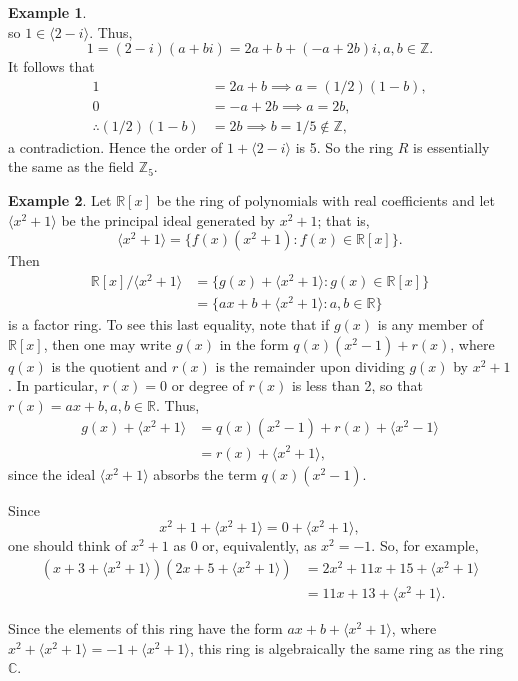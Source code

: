 \documentclass{article}
\theoremstyle{definition}
\newtheorem{example}{Example}[section]
\begin{document}
\begin{example}
\begin{equation*}
    \end{equation*}
    so $1\in\langle 2-i \rangle$. Thus,
    \begin{equation*}
        1=(2-i)(a+bi)=2a+b+(-a+2b)i, a,b \in\mathbb{Z}.
    \end{equation*}
    It follows that 
    \begin{align*}
        1&=2a+b \implies a=(1/2)(1-b), \\ 
        0&=-a+2b \implies a=2b,\\
        \therefore (1/2)(1-b)&=2b \implies b=1/5\notin\mathbb{Z},
    \end{align*}
    a contradiction. Hence the order of $1+\langle 2-i \rangle$ is 5. So the ring $R$ is essentially the same as the field $\mathbb{Z}_5$.
\end{example}

\begin{example}
    Let $\mathbb{R}[x]$ be the ring of polynomials with real coefficients and let $\langle x^2+1 \rangle$ be the principal ideal generated by $x^2+1$; that is,
    \begin{equation*}
        \langle x^2+1 \rangle = \{f(x)(x^2+1): f(x)\in\mathbb{R}[x]\}.
    \end{equation*}
    Then
    \begin{align*}
        \mathbb{R}[x]/\langle x^2+1 \rangle &= \{g(x)+\langle x^2+1 \rangle: g(x)\in\mathbb{R}[x]\} \\
        &= \{ax+b+\langle x^2+1 \rangle: a,b\in\mathbb{R}\}
    \end{align*}
    is a factor ring. To see this last equality, note that if $g(x)$ is any member of $\mathbb{R}[x]$, then one may write $g(x)$ in the form $q(x)(x^2-1)+r(x)$, where $q(x)$ is the quotient and $r(x)$ is the remainder upon dividing $g(x)$ by $x^2+1$. In particular, $r(x)=0$ or degree of $r(x)$ is less than 2, so that $r(x)=ax+b, a,b\in\mathbb{R}$. Thus,
    \begin{align*}
        g(x)+\langle x^2+1 \rangle &= q(x)(x^2-1)+r(x)+\langle x^2-1 \rangle \\
        &= r(x)+\langle x^2+1 \rangle,
    \end{align*}
    since the ideal $\langle x^2+1 \rangle$ absorbs the term $q(x)(x^2-1)$.
    
    Since 
    \begin{equation*}
        x^2+1+\langle x^2+1 \rangle = 0 + \langle x^2+1 \rangle,
    \end{equation*}
    one should think of $x^2+1$ as 0 or, equivalently, as $x^2=-1$. So, for example,
    \begin{align*}
        (x+3+\langle x^2+1 \rangle)(2x+5+\langle x^2+1 \rangle)&=2x^2+11x+15+\langle x^2+1 \rangle \\
        &=11x+13+\langle x^2+1 \rangle.
    \end{align*}
    
    Since the elements of this ring have the form $ax+b+\langle x^2+1 \rangle$, where $x^2+\langle x^2+1 \rangle=-1+\langle x^2+1 \rangle$, this ring is algebraically the same ring as the ring $\mathbb{C}$.
\end{example}
\end{document}
